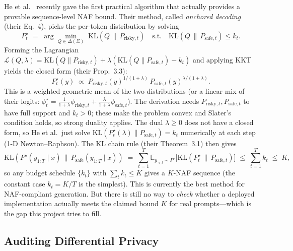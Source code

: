 \documentclass{article}
\begin{document}
He et al.\ \cite{he2026anchored} recently gave the first practical algorithm that actually provides a provable sequence-level NAF bound. Their method, called \emph{anchored decoding} (their Eq.~4), picks the per-token distribution by solving
\begin{equation}
\label{eq:anchored}
  P^\star_t \;=\; \arg\min_{Q\in\Delta(\Sigma)}\;\mathrm{KL}\!\left(Q\,\|\,P_{\mathrm{risky},t}\right)
  \quad\text{s.t.}\quad \mathrm{KL}(Q\,\|\,P_{\mathrm{safe},t})\le k_t.
\end{equation}
Forming the Lagrangian $\mathcal{L}(Q,\lambda) = \mathrm{KL}(Q\|P_{\mathrm{risky},t}) + \lambda(\mathrm{KL}(Q\|P_{\mathrm{safe},t})-k_t)$ and applying KKT yields the closed form (their Prop.~3.3):
\begin{equation}
\label{eq:anchored-closed}
  P^\star_t(y) \;\propto\; P_{\mathrm{risky},t}(y)^{1/(1+\lambda)}\,P_{\mathrm{safe},t}(y)^{\lambda/(1+\lambda)}.
\end{equation}
This is a weighted geometric mean of the two distributions (or a linear mix of their logits: $\phi^\star_t = \tfrac{1}{1+\lambda}\phi_{\mathrm{risky},t}+\tfrac{\lambda}{1+\lambda}\phi_{\mathrm{safe},t}$). The derivation needs $P_{\mathrm{risky},t},P_{\mathrm{safe},t}$ to have full support and $k_t>0$; these make the problem convex and Slater's condition holds, so strong duality applies. The dual $\lambda\ge 0$ does not have a closed form, so He et al.\ just solve $\mathrm{KL}(P^\star_t(\lambda)\|P_{\mathrm{safe},t}) = k_t$ numerically at each step (1-D Newton--Raphson). The KL chain rule (their Theorem~3.1) then gives
\begin{equation}
  \mathrm{KL}(P^\star(y_{1:T}\mid x)\,\|\,P_{\mathrm{safe}}(y_{1:T}\mid x)) \;=\; \sum_{t=1}^{T}\mathbb{E}_{y_{<t}\sim P^\star}\!\bigl[\mathrm{KL}(P^\star_t\,\|\,P_{\mathrm{safe},t})\bigr] \;\le\; \sum_{t=1}^{T}k_t \;\le\; K,
\end{equation}
so any budget schedule $\{k_t\}$ with $\sum_t k_t\le K$ gives a $K$-NAF sequence (the constant case $k_t=K/T$ is the simplest). This is currently the best method for NAF-compliant generation. But there is still no way to \emph{check} whether a deployed implementation actually meets the claimed bound $K$ for real prompts---which is the gap this project tries to fill.

\subsection{Auditing Differential Privacy}
\end{document}
